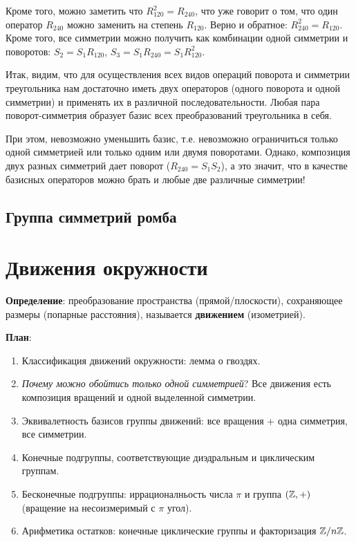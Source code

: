 Кроме того, можно заметить что $R_{120}^2=R_{240}$, что уже говорит о том, что один оператор $R_{240}$ можно заменить на степень $R_{120}$. Верно и обратное: $R_{240}^2=R_{120}$. Кроме того, все симметрии можно получить как комбинации одной симметрии и поворотов: $S_2=S_1R_{120}$, $S_3=S_1R_{240}=S_1R_{120}^2$.

Итак, видим, что для осуществления всех видов операций поворота и симметрии треугольника нам достаточно иметь двух операторов (одного поворота и одной симметрии) и применять их в различной последовательности. Любая пара поворот-симметрия образует базис всех преобразований треугольника в себя.

При этом, невозможно уменьшить базис, т.е. невозможно ограничиться только одной симметрией или только одним или двумя поворотами. Однако, композиция двух разных симметрий дает поворот ($R_{240}=S_1S_2$), а это значит, что в качестве базисных операторов можно брать и любые две различные симметрии!


\subsection{Группа симметрий ромба}








\section{Движения окружности}
 

\textbf{Определение}: преобразование пространства (прямой/плоскости), сохраняющее размеры (попарные расстояния), называется \textbf{движением} (изометрией).

\textbf{План}:
\begin{enumerate}
\item Классификация движений окружности: лемма о гвоздях.
\item \textit{Почему можно обойтись только одной симметрией}? Все движения есть композиция вращений и одной выделенной симметрии.
\item Эквивалетность базисов группы движений: все вращения + одна симметрия, все симметрии.
\item Конечные подгруппы, соответствующие диэдральным и циклическим группам.
\item Бесконечные подгруппы: иррационалньость числа $\pi$ и группа $(\mathbb Z,+)$ (вращение на несоизмеримый с $\pi$ угол).
\item Арифметика остатков: конечные циклические группы и факторизация $\mathbb Z/n\mathbb Z$.
\end{enumerate}



